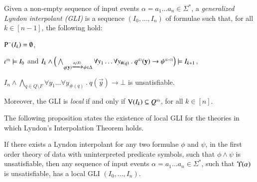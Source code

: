 \begin{definition}\label{def:generalized-lyndon-interpolant}
  Given a non-empty sequence of input events $\alpha = a_1 \ldots a_n
  \in \Sigma^*$, a \emph{generalized Lyndon interpolant (GLI)} is a
  sequence $(I_0,\ldots,I_n)$ of formulae such that, for all $k \in
  [n-1]$, the following hold: \begin{compactenum}
    \item\label{it1:generalized-lyndon-interpolant} $\mathrm{P}^{-}(I_k) =
      \emptyset$,
    \item\label{it2:generalized-lyndon-interpolant} ${\iota}^{\scriptscriptstyle{({0})}}
      \models I_0$ and \(I_k \wedge \Big(\bigwedge_{q(\mathbf y)
        \xrightarrow{{\scriptscriptstyle a_i(X)}}_{{\scriptstyle }} \psi \in \Delta} \forall y_1 \ldots \forall
      y_{\#(q)} ~.~ {q}^{\scriptscriptstyle{({k})}}(\mathbf y) \rightarrow
      {\psi}^{\scriptscriptstyle{({k+1})}}\Big) \models I_{k+1}\),
    \item\label{it3:generalized-lyndon-interpolant} $I_n \wedge
      \bigwedge_{q \in Q \setminus F} \forall y_1 \ldots \forall
      y_{\#(q)} ~.~ q(\vec{y}) \rightarrow \bot$ is unsatisfiable.
  \end{compactenum}
  Moreover, the GLI is \emph{local} if and only if $\mathrm{V}({I_k})
  \subseteq {Q}^{\scriptscriptstyle{({k})}}$, for all $k \in [n]$.
\end{definition}
The following proposition states the existence of local GLI for the
theories in which Lyndon's Interpolation Theorem holds.

\begin{proposition}\label{prop:local-gli}
  If there exists a Lyndon interpolant for any two formulae $\phi$ and
  $\psi$, in the first order theory of data with uninterpreted
  predicate symbols, such that $\phi \wedge \psi$ is unsatisfiable,
  then any sequence of input events $\alpha = a_1 \ldots a_n \in
  \Sigma^*$, such that $\Upsilon({\alpha})$ is unsatisfiable, has a
  local GLI $(I_0,\ldots,I_n)$.
\end{proposition}
